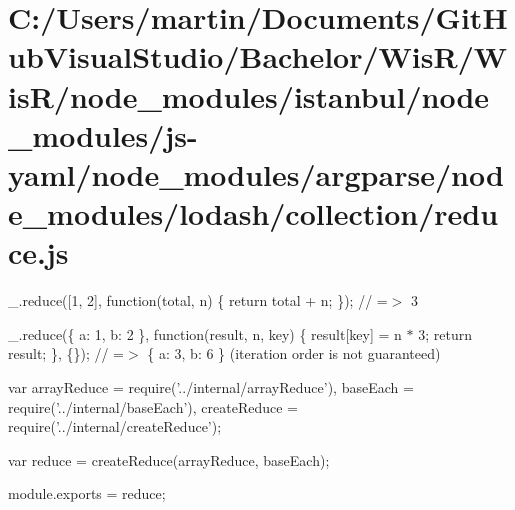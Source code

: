 \hypertarget{_c_1_2_users_2martin_2_documents_2_git_hub_visual_studio_2_bachelor_2_wis_r_2_wis_r_2node_moduleeb072a054beac4b00aefef72228fc53c}{}\section{C\+:/\+Users/martin/\+Documents/\+Git\+Hub\+Visual\+Studio/\+Bachelor/\+Wis\+R/\+Wis\+R/node\+\_\+modules/istanbul/node\+\_\+modules/js-\/yaml/node\+\_\+modules/argparse/node\+\_\+modules/lodash/collection/reduce.\+js}
\+\_\+.\+reduce(\mbox{[}1, 2\mbox{]}, function(total, n) \{ return total + n; \}); // =$>$ 3

\+\_\+.\+reduce(\{ \textquotesingle{}a\textquotesingle{}\+: 1, \textquotesingle{}b\textquotesingle{}\+: 2 \}, function(result, n, key) \{ result\mbox{[}key\mbox{]} = n $\ast$ 3; return result; \}, \{\}); // =$>$ \{ \textquotesingle{}a\textquotesingle{}\+: 3, \textquotesingle{}b\textquotesingle{}\+: 6 \} (iteration order is not guaranteed)


\begin{DoxyCodeInclude}
var arrayReduce = require(\textcolor{stringliteral}{'../internal/arrayReduce'}),
    baseEach = require(\textcolor{stringliteral}{'../internal/baseEach'}),
    createReduce = require(\textcolor{stringliteral}{'../internal/createReduce'});

var reduce = createReduce(arrayReduce, baseEach);

module.exports = reduce;
\end{DoxyCodeInclude}
 
